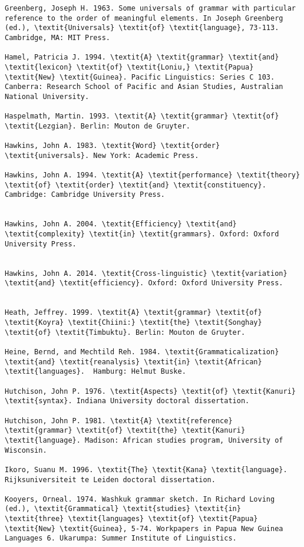 \documentclass[output=paper]{langsci/langscibook}
\begin{document}
\begin{verbatim}
Greenberg, Joseph H. 1963. Some universals of grammar with particular reference to the order of meaningful elements. In Joseph Greenberg (ed.), \textit{Universals} \textit{of} \textit{language}, 73-113. Cambridge, MA: MIT Press. 

Hamel, Patricia J. 1994. \textit{A} \textit{grammar} \textit{and} \textit{lexicon} \textit{of} \textit{Loniu,} \textit{Papua} \textit{New} \textit{Guinea}. Pacific Linguistics: Series C 103. Canberra: Research School of Pacific and Asian Studies, Australian National University.

Haspelmath, Martin. 1993. \textit{A} \textit{grammar} \textit{of} \textit{Lezgian}. Berlin: Mouton de Gruyter.

Hawkins, John A. 1983. \textit{Word} \textit{order} \textit{universals}. New York: Academic Press.

Hawkins, John A. 1994. \textit{A} \textit{performance} \textit{theory} \textit{of} \textit{order} \textit{and} \textit{constituency}. Cambridge: Cambridge University Press.


Hawkins, John A. 2004. \textit{Efficiency} \textit{and} \textit{complexity} \textit{in} \textit{grammars}. Oxford: Oxford University Press.


Hawkins, John A. 2014. \textit{Cross-linguistic} \textit{variation} \textit{and} \textit{efficiency}. Oxford: Oxford University Press.


Heath, Jeffrey. 1999. \textit{A} \textit{grammar} \textit{of} \textit{Koyra} \textit{Chiini:} \textit{the} \textit{Songhay} \textit{of} \textit{Timbuktu}. Berlin: Mouton de Gruyter.

Heine, Bernd, and Mechtild Reh. 1984. \textit{Grammaticalization} \textit{and} \textit{reanalysis} \textit{in} \textit{African} \textit{languages}.  Hamburg: Helmut Buske.

Hutchison, John P. 1976. \textit{Aspects} \textit{of} \textit{Kanuri} \textit{syntax}. Indiana University doctoral dissertation.

Hutchison, John P. 1981. \textit{A} \textit{reference} \textit{grammar} \textit{of} \textit{the} \textit{Kanuri} \textit{language}. Madison: African studies program, University of Wisconsin.

Ikoro, Suanu M. 1996. \textit{The} \textit{Kana} \textit{language}. Rijksuniversiteit te Leiden doctoral dissertation.

Kooyers, Orneal. 1974. Washkuk grammar sketch. In Richard Loving (ed.), \textit{Grammatical} \textit{studies} \textit{in} \textit{three} \textit{languages} \textit{of} \textit{Papua} \textit{New} \textit{Guinea}, 5-74. Workpapers in Papua New Guinea Languages 6. Ukarumpa: Summer Institute of Linguistics.


\end{verbatim}
\end{document}
